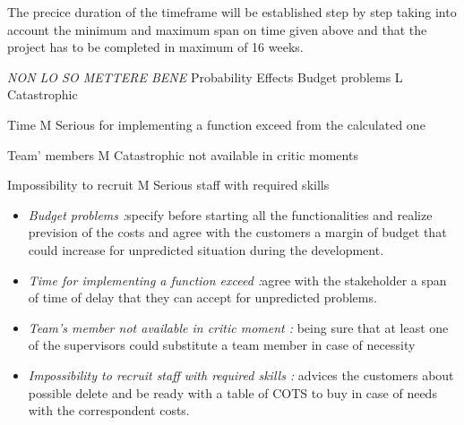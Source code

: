 The precice duration of the timeframe will be established step by step taking into account the minimum and maximum span on time given above and that the project has to be completed in maximum of 16 weeks.

\emph{ \huge NON LO SO METTERE BENE}
		Probability		Effects
		Budget problems		L			Catastrophic
		
		Time                                    M                            Serious
		for implementing 
		a function exceed
		from the calculated one
		
		Team’ members                  M                            Catastrophic
		not available in critic
		moments
		
		Impossibility to recruit          M                           Serious
		staff with required skills  

\begin{itemize}
	\item \emph{Budget problems :}specify before starting all the functionalities and realize prevision of the costs and agree with the customers a margin of budget that could increase for unpredicted situation during the development.
	
	\item \emph{Time for implementing a function exceed :}agree with the stakeholder a span of time of delay that they can accept for unpredicted problems.
	
	\item \emph{Team’s member not available in critic moment :} being sure that at least one of the supervisors could substitute a team member in case of necessity
	
	\item \emph{Impossibility to recruit staff with required skills :} advices the customers about possible delete and be ready with a table of COTS to buy in case of needs with the correspondent costs.
	
\end{itemize}

